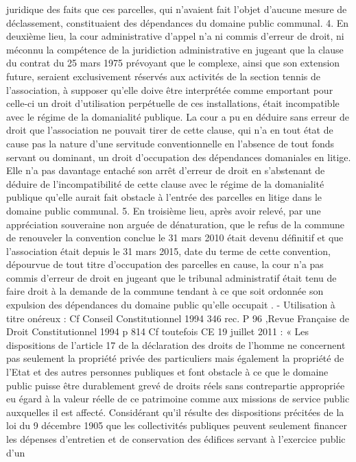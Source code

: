 \documentclass[11pt,a4paper]{report}
\begin{document}
juridique des faits que ces parcelles, qui n'avaient fait l'objet d'aucune mesure de déclassement, constituaient des
dépendances du domaine public communal.
4. En deuxième lieu, la cour administrative d'appel n'a ni commis d'erreur de droit, ni méconnu la compétence de
la juridiction administrative en jugeant que la clause du contrat du 25 mars 1975 prévoyant que le complexe, ainsi
que son extension future, seraient exclusivement réservés aux activités de la section tennis de l'association, à
supposer qu'elle doive être interprétée comme emportant pour celle-ci un droit d'utilisation perpétuelle de ces
installations, était incompatible avec le régime de la domanialité publique. La cour a pu en déduire sans erreur
de droit que l'association ne pouvait tirer de cette clause, qui n'a en tout état de cause pas la nature d'une servitude
conventionnelle en l'absence de tout fonds servant ou dominant, un droit d'occupation des dépendances
domaniales en litige. Elle n'a pas davantage entaché son arrêt d'erreur de droit en s'abstenant de déduire de
l'incompatibilité de cette clause avec le régime de la domanialité publique qu'elle aurait fait obstacle à l'entrée
des parcelles en litige dans le domaine public communal.
5. En troisième lieu, après avoir relevé, par une appréciation souveraine non arguée de dénaturation, que le refus
de la commune de renouveler la convention conclue le 31 mars 2010 était devenu définitif et que l'association était
depuis le 31 mars 2015, date du terme de cette convention, dépourvue de tout titre d'occupation des parcelles en
cause, la cour n'a pas commis d'erreur de droit en jugeant que le tribunal administratif était tenu de faire droit à
la demande de la commune tendant à ce que soit ordonnée son expulsion des dépendances du domaine public
qu'elle occupait .
- Utilisation à titre onéreux : Cf Conseil Constitutionnel 1994 346 rec. P 96 ,Revue Française de Droit
Constitutionnel 1994 p 814
Cf toutefois CE 19 juillet 2011 : « Les dispositions de l’article 17 de la déclaration des droits de l’homme ne
concernent pas seulement la propriété privée des particuliers mais également la propriété de l’Etat et des autres
personnes publiques et font obstacle à ce que le domaine public puisse être durablement grevé de droits réels sans
contrepartie appropriée eu égard à la valeur réelle de ce patrimoine comme aux missions de service public
auxquelles il est affecté.
Considérant qu'il résulte des dispositions précitées de la loi du 9 décembre 1905 que les collectivités publiques
peuvent seulement financer les dépenses d'entretien et de conservation des édifices servant à l'exercice public d'un
\end{document}
